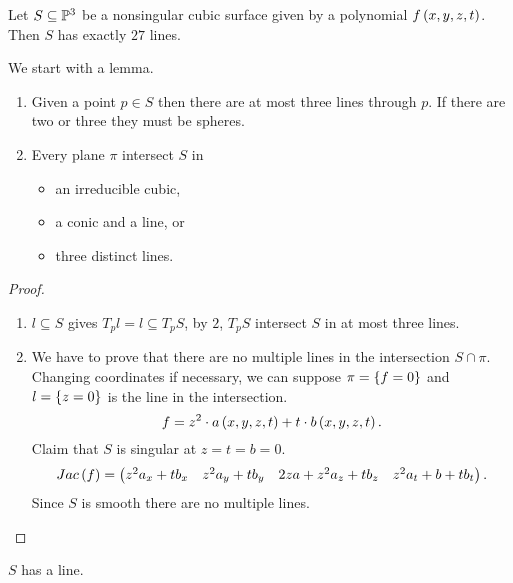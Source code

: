 
\begin{theorem}
Let $ S \subseteq \P^3 $ be a nonsingular cubic surface given by a polynomial $ f\br{x, y, z, t} $. Then $ S $ has exactly $ 27 $ lines.
\end{theorem}

We start with a lemma.

\begin{lemma}
\hfill
\begin{enumerate}
\item Given a point $ p \in S $ then there are at most three lines through $ p $. If there are two or three they must be spheres.
\item Every plane $ \pi $ intersect $ S $ in
\begin{itemize}
\item an irreducible cubic,
\item a conic and a line, or
\item three distinct lines.
\end{itemize}
\end{enumerate}
\end{lemma}

\begin{proof}
\hfill
\begin{enumerate}
\item $ l \subseteq S $ gives $ T_pl = l \subseteq T_pS $, by $ 2 $, $ T_pS $ intersect $ S $ in at most three lines.
\item We have to prove that there are no multiple lines in the intersection $ S \cap \pi $. Changing coordinates if necessary, we can suppose $ \pi = \cbr{f = 0} $ and $ l = \cbr{z = 0} $ is the line in the intersection.
$$ f = z^2 \cdot a\br{x, y, z, t} + t \cdot b\br{x, y, z, t}. $$
Claim that $ S $ is singular at $ z = t = b = 0 $.
$$ Jac\br{f} = \onebytwo{z^2a_x + tb_x & z^2a_y + tb_y}{2za + z^2a_z + tb_z & z^2a_t + b + tb_t}. $$
Since $ S $ is smooth there are no multiple lines.
\end{enumerate}
\end{proof}

\begin{lemma}
$ S $ has a line.
\end{lemma}

